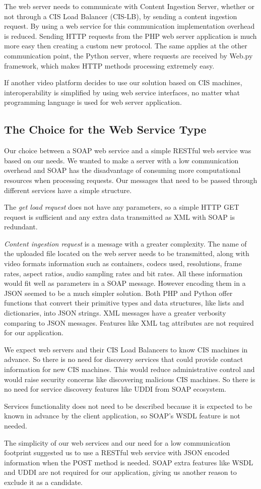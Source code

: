 The web server needs to communicate with Content Ingestion Server, whether or not through a CIS Load Balancer (CIS-LB), by sending a content ingestion request. By using a web service for this communication  implementation overhead is reduced. Sending HTTP requests from the PHP web server application is much more easy then creating a custom new protocol. The same applies at the other communication point, the Python server, where requests are received by Web.py framework, which makes HTTP methods processing extremely easy.

If another video platform decides to use our solution based on CIS machines, interoperability is simplified by using web service interfaces, no matter what programming language is used for web server application.

\subsection{The Choice for the Web Service Type}
\label{subsec:web-service}

Our choice between a SOAP web service and a simple RESTful web service was based on our needs. We wanted to make a server with a low communication overhead and SOAP has the disadvantage of consuming more computational resources when processing requests. Our messages that need to be passed through different services have a simple structure. 

The \textit{get load request} does not have any parameters, so a simple HTTP GET request is sufficient and any extra data transmitted as XML with SOAP is redundant.

\textit{Content ingestion request} is a message with a greater complexity. The name of the uploaded file located on the web server needs to be transmitted, along with video formats information such as containers, codecs used, resolutions, frame rates, aspect ratios, audio sampling rates and bit rates. All these information would fit well as parameters in a SOAP message. However encoding them in a JSON seemed to be a much simpler solution. Both PHP and Python offer functions that convert their primitive types and data structures, like lists and dictionaries, into JSON strings. XML messages have a greater verbosity comparing to JSON messages. Features like XML tag attributes are not required for our application.

We expect web servers and their CIS Load Balancers to know CIS machines in advance. So there is no need for discovery services that could provide contact information for new CIS machines. This would reduce administrative control and would raise security concerns like discovering malicious CIS machines. So there is no need for service discovery features like UDDI from SOAP ecosystem.

Services functionality does not need to be described because it is expected to be known in advance by the client application, so SOAP's WSDL feature is not needed.

The simplicity of our web services and our need for a low communication footprint suggested us to use a RESTful web service with JSON encoded information when the POST method is needed. SOAP extra features like WSDL and UDDI are not required for our application, giving us another reason to exclude it as a candidate.